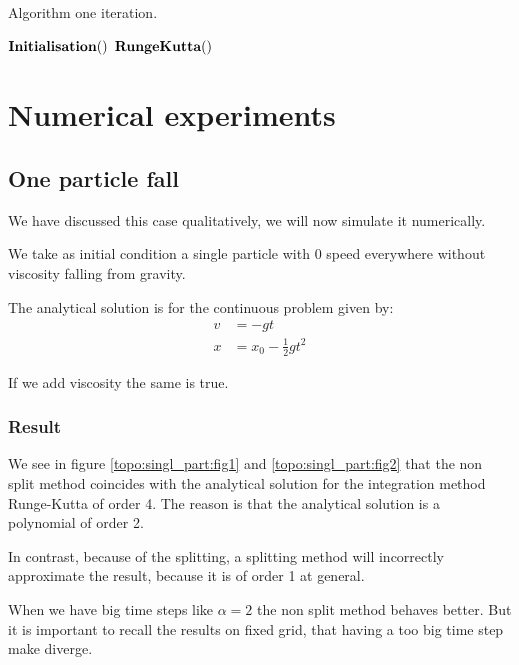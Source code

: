 \begin{algorithm}
\caption{Algorithm one iteration.}
\label{code:RungeKutta3}
\begin{algorithmic}[1]
\State $\mathop{\textbf{Initialisation}}()$
\State $\mathop{\textbf{RungeKutta}}()$
\EndProcedure
        \end{algorithmic}
\end{algorithm}

\FloatBarrier
\section{Numerical experiments}

\subsection{One particle fall}
\label{top:exp:one}
We have discussed this case qualitatively, we will now simulate it numerically.

We take as initial condition a single particle with 0 speed everywhere without viscosity falling from gravity.

The analytical solution is for the continuous problem given by:
\begin{align}
v&=-gt\\
x&=x_0-\frac{1}{2}gt^2
\end{align}

If we add viscosity the same is true.

\subsubsection{Result}

We see in figure \ref{topo:singl_part:fig1} and \ref{topo:singl_part:fig2} that the non split method coincides with the analytical solution for the
integration method Runge-Kutta of order 4. The reason is that the analytical solution is a polynomial of order 2.

In contrast, because of the splitting, a splitting method will incorrectly approximate the result, because it is of order 1 at general.

When we have big time steps like $\alpha=2$ the non split method behaves better. But it is important to recall the results on fixed grid,
that having a too big time step make diverge.

